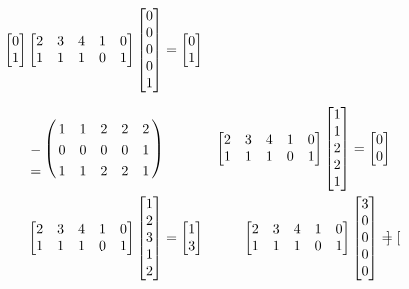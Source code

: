 \documentclass[a4paper,12pt]{article}
\theoremstyle{definition}%
\theoremstyle{definition}
\theoremstyle{problem}
\let\bbordermatrix\bordermatrix
\begin{document}
\begin{enumerate}[label=\alph*)]
\begin{align*}
\begin{bmatrix}
0\\1
\end{bmatrix} &\begin{bmatrix}
2& 3& 4& 1& 0\\
1& 1& 1& 0& 1 
\end{bmatrix}\begin{bmatrix}
0\\ 0\\ 0\\ 0\\ 1
\end{bmatrix}=\begin{bmatrix}
0\\1
\end{bmatrix} \\
&\bbordermatrix{
&&&&&\cr
&1&1&2&2&2\cr
-&0&0&0&0&1\cr
=&1&1&2&2&1
}&\begin{bmatrix}
2& 3& 4& 1& 0\\
1& 1& 1& 0& 1 
\end{bmatrix}\begin{bmatrix}
1\\ 1\\ 2\\ 2\\ 1
\end{bmatrix}=\begin{bmatrix}
0\\0
\end{bmatrix}\\
&\begin{bmatrix}
2& 3& 4& 1& 0\\
1& 1& 1& 0& 1 
\end{bmatrix}\begin{bmatrix}
1\\ 2\\ 3\\ 1\\ 2
\end{bmatrix}=\begin{bmatrix}
1\\3
\end{bmatrix}&\begin{bmatrix}
2& 3& 4& 1& 0\\
1& 1& 1& 0& 1 
\end{bmatrix}\begin{bmatrix}
3\\ 0\\ 0\\ 0\\ 0
\end{bmatrix}=\begin{bmatrix}

\end{bmatrix}
\end{align*}
\end{enumerate}
\end{document}
